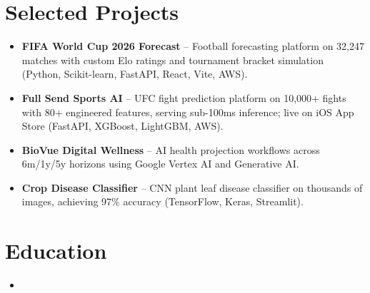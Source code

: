 \documentclass[11pt,a4paper,sans]{moderncv}
\begin{document}

\section{Selected Projects}
\vspace{1pt}
\begin{itemize}
\item{\textbf{FIFA World Cup 2026 Forecast} -- Football forecasting platform on 32,247 matches with custom Elo ratings and tournament bracket simulation (Python, Scikit-learn, FastAPI, React, Vite, AWS).}
\item{\textbf{Full Send Sports AI} -- UFC fight prediction platform on 10,000+ fights with 80+ engineered features, serving sub-100ms inference; live on iOS App Store (FastAPI, XGBoost, LightGBM, AWS).}
\item{\textbf{BioVue Digital Wellness} -- AI health projection workflows across 6m/1y/5y horizons using Google Vertex AI and Generative AI.}
\item{\textbf{Crop Disease Classifier} -- CNN plant leaf disease classifier on thousands of images, achieving 97\% accuracy (TensorFlow, Keras, Streamlit).}
\end{itemize}


\section{Education}
\vspace{1pt}
\begin{itemize}

\item{}

\end{itemize}

\end{document}
